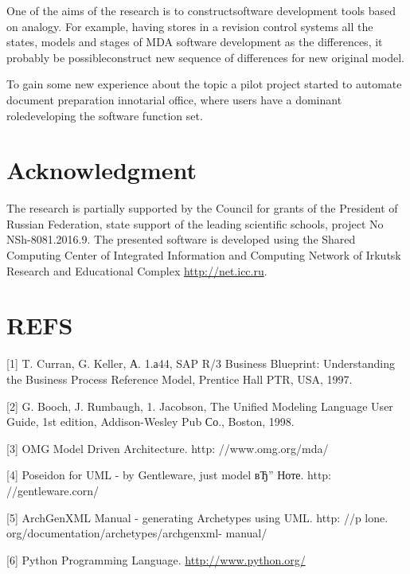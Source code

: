\documentclass{intech}
\begin{document}
One of the aims of the research is to constructsoftware development tools based on analogy. For example, having stores in a revision control systems all the states, models and stages of MDA software development as the differences, it probably be possibleconstruct new sequence of differences for new original model.

To gain some new experience about the topic a pilot project started to automate document preparation innotarial office, where users have a dominant roledeveloping the software function set.

\section{Acknowledgment}

The research is partially supported by the Council for grants of the President of Russian Federation, state support of the leading scientific schools, project No NSh-8081.2016.9.  The presented software is developed using the Shared Computing Center of Integrated Information and Computing Network of Irkutsk Research and Educational Complex \url{http://net.icc.ru}.


\section{REFS}
\label{sec:refs-tmp}

[1] T. Curran, G. Keller, А. 1.а44, SAP R/3 Business Blueprint:
Understanding the Business Process Reference Model,
Prentice Hall PTR, USA, 1997.

[2] G. Booch, J. Rumbaugh, 1. Jacobson, The Unified Modeling
Language User Guide, 1st edition, Addison-Wesley Pub
Со., Boston, 1998.

[3] OMG Model Driven Architecture. http: //www.omg.org/mda/

[4] Poseidon for UML - by Gentleware, just model вЂ” Ноте.
http: //gentleware.corn/

[5] ArchGenXML Manual - generating Archetypes using UML.
http: //p lone. org/documentation/archetypes/archgenxml-
manual/

[6] Python Programming Language. \url{http://www.python.org/}
\end{document}
